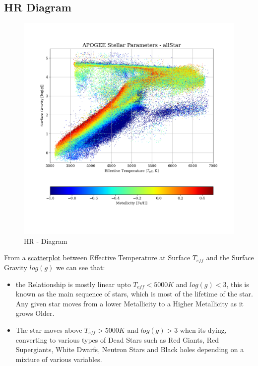 \documentclass{article}
\begin{document}
\subsection{HR Diagram}
\begin{figure}[H]
    \centering
    \label{fig:4}
    \includegraphics[width=\textwidth]{Images/APOGEEStellarParameters-allStar.png}
    \caption{HR - Diagram}
\end{figure}
From a \hyperref[fig:4]{scatterplot} between  Effective Temperature at Surface \(T_{eff}\) and the Surface Gravity \(log( g)\) we can see that:
\begin{itemize}
  \item the Relationship is mostly linear upto \(T_{eff} < 5000K\) and \(log(g) < 3\), this is known as the main sequence of stars, which is most of the lifetime of the star. Any given star moves from a lower Metallicity to a Higher Metallicity as it grows Older.

  \item The star moves above \(T_{eff} > 5000K\) and \(log(g) > 3\) when its dying, converting to various types of Dead Stars such as Red Giants, Red Supergiants, White Dwarfs, Neutron Stars and Black holes depending on a mixture of various variables.
\end{itemize}
\end{document}
